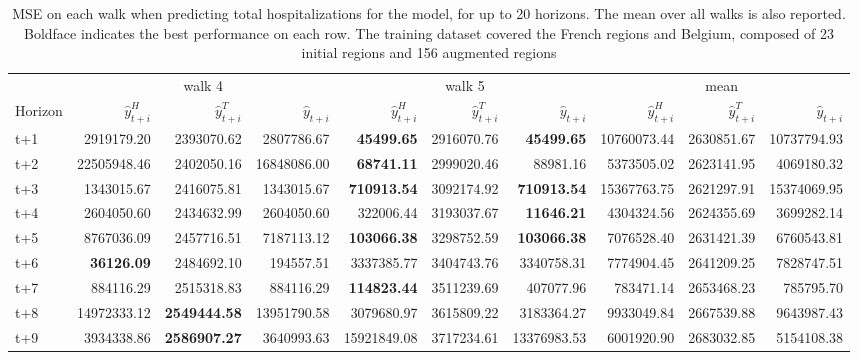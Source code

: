 \begin{table}[H]
\centering
\caption{MSE on each walk when predicting total hospitalizations for the model, for up to 20 horizons. The mean over all walks is also reported. Boldface indicates the best performance on each row. The training dataset covered the French regions and Belgium, composed of 23 initial regions and 156 augmented regions }
\label{tab:MSE_walk_assemble}
\begin{tabular}{lrrrrrrrrr}
\toprule
 & \multicolumn{3}{c}{walk 4} & \multicolumn{3}{c}{walk 5} & \multicolumn{3}{c}{mean} 
\\

\cmidrule(lr){2-4} \cmidrule(lr){5-7} \cmidrule(lr){8-10} 
Horizon & $\hat{y}_{t+i}^H$ & $\hat{y}_{t+i}^T$ & $\hat{y}_{t+i}$ & $\hat{y}_{t+i}^H$ & $\hat{y}_{t+i}^T$ & $\hat{y}_{t+i}$ & $\hat{y}_{t+i}^H$ & $\hat{y}_{t+i}^T$ & $\hat{y}_{t+i}$ \\
\midrule
t+1  & 2919179.20  & 2393070.62  & 2807786.67  & \textbf{45499.65}  & 2916070.76  & \textbf{45499.65}  & 10760073.44  & 2630851.67  & 10737794.93  \\
t+2  & 22505948.46  & 2402050.16  & 16848086.00  & \textbf{68741.11}  & 2999020.46  & 88981.16  & 5373505.02  & 2623141.95  & 4069180.32  \\
t+3  & 1343015.67  & 2416075.81  & 1343015.67  & \textbf{710913.54}  & 3092174.92  & \textbf{710913.54}  & 15367763.75  & 2621297.91  & 15374069.95  \\
t+4  & 2604050.60  & 2434632.99  & 2604050.60  & 322006.44  & 3193037.67  & \textbf{11646.21}  & 4304324.56  & 2624355.69  & 3699282.14  \\
t+5  & 8767036.09  & 2457716.51  & 7187113.12  & \textbf{103066.38}  & 3298752.59  & \textbf{103066.38}  & 7076528.40  & 2631421.39  & 6760543.81  \\
t+6  & \textbf{36126.09}  & 2484692.10  & 194557.51  & 3337385.77  & 3404743.76  & 3340758.31  & 7774904.45  & 2641209.25  & 7828747.51  \\
t+7  & 884116.29  & 2515318.83  & 884116.29  & \textbf{114823.44}  & 3511239.69  & 407077.96  & 783471.14  & 2653468.23  & 785795.70  \\
t+8  & 14972333.12  & \textbf{2549444.58}  & 13951790.58  & 3079680.97  & 3615809.22  & 3183364.27  & 9933049.84  & 2667539.88  & 9643987.43  \\
t+9  & 3934338.86  & \textbf{2586907.27}  & 3640993.63  & 15921849.08  & 3717234.61  & 13376983.53  & 6001920.90  & 2683032.85  & 5154108.38  \\

\end{tabular}
\end{table}
